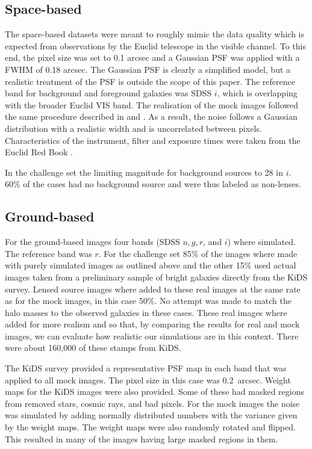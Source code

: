 \documentclass{aa}
\begin{document}
\subsection{Space-based}
\label{sec:sim-space-based}

The space-based datasets were meant to roughly mimic the data quality which is expected from observations by the Euclid telescope in the visible channel. To this end, the pixel size was set to 0.1 arcsec and a Gaussian PSF was applied with a FWHM of 0.18 arcsec. The Gaussian PSF is clearly a simplified model, but a realistic treatment of the PSF is outside the scope of this paper. The reference band for background and foreground galaxies was SDSS $i$, which is overlapping with the broader Euclid VIS band. The realisation of the mock images followed the same procedure described in \citet{2004PASP..116..750G} and \citet{2008AandA...482..403M}. As a result, the noise follows a Gaussian distribution with a realistic width and is uncorrelated between pixels. Characteristics of the instrument, filter and exposure times were taken from the Euclid Red Book \citep{2011arXiv1110.3193L}.
 
 In the challenge set the limiting magnitude for background sources to 28 in $i$.   60\% of the cases had no background source and were thus labeled as non-lenses.
 
\subsection{Ground-based}
\label{sec:sim-ground-based}

For the ground-based images four bands (SDSS $u,g,r$, and $i$) where simulated.  The reference band was $r$.  For the challenge set 85\% of the images where made with purely simulated images as outlined above and the other 15\% used actual images taken from a preliminary sample of bright galaxies directly from the KiDS survey.  Lensed source images where added to these real images at the same rate as for the mock images,  in this case 50\%.  No attempt was made to match the halo masses to the observed galaxies in these cases.  These real images where added for more realism and so that, by comparing the results for real and mock images, we can evaluate how realistic our simulations are in this context.  There were about 160,000 of these stamps from KiDS.

The KiDS survey provided a representative PSF map in each band that was applied to all mock images.   The pixel size in this case was 0.2~arcsec. 
Weight maps for the KiDS images were also provided.  Some of these had masked regions from removed stars, cosmic rays, and bad pixels.  For the mock images the noise was simulated by adding normally distributed numbers with the variance given by the weight maps.  The weight maps were also randomly rotated and flipped.  This resulted in many of the images having large masked regions in them.
\end{document}
